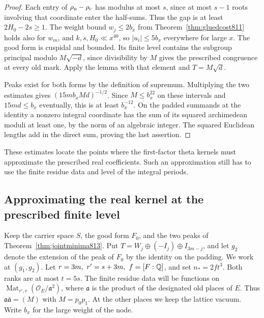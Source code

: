 \documentclass[a4paper,11pt]{article}
\theoremstyle{definition}
\theoremstyle{remark}
\numberwithin{equation}{section}
\begin{document}
\begin{proof}
Each entry of \(\rho_{\rm n}-\rho_{\rm c}\) has modulus
at most \(s\), since at most \(s-1\) roots involving that
coordinate enter the half-sums. Thus the gap is at least
\(2H_0-2s\ge1\). The weight bound \(w_j\le2b_x\) from
Theorem~\ref{thm:gluedcost811} holds also for \(w_m\),
and \(k,s,H_0\ll x^{40}\), so \(|u_i|\le5b_x\) everywhere
for large \(x\). The good form is cuspidal and bounded.
Its finite level contains the subgroup principal modulo
\(M\sqrt{-d}\), since divisibility by \(M\) gives the
prescribed congruence at every old mark. Apply the lemma
with that element and \(T=M\sqrt d\).

Peaks exist for both forms by the definition of supremum.
Multiplying the two estimates gives
\((15m b_x M d)^{-1/2}\). Since \(M\le b_x^{22}\) on
these intervals and \(15md\le b_x\) eventually, this is
at least \(b_x^{-12}\). On the padded summands at the
identity a nonzero integral coordinate has the sum of
its squared archimedean moduli at least one, by the norm
of an algebraic integer. The squared Euclidean lengths add
in the direct sum, proving the last assertion.
\end{proof}

These estimates locate the points where the first-factor
theta kernels must approximate the prescribed real
coefficients. Such an approximation still has to use the
finite residue data and level of the integral periods.
\clearpage

\subsection{Approximating the real kernel at the prescribed finite level}
\label{sec:sparseperiod814}
Keep the carrier space \(S\), the good form \(F_0\), and the
two peaks of Theorem~\ref{thm:jointminima813}. Put
\(T=W_j\oplus(-I_j)\oplus I_{3m-j}\), and let \(g_2\)
denote the extension of the peak of \(F_0\) by the identity
on the padding. We work at \((g_1,g_2)\).
Let \(r=3m,\ r'=s+3m,\ f=[F:\mathbb Q]\), and set
\(n_*=2ft^3\). Both ranks are at most \(t=5s\).
The finite residue data will be functions on
\(\operatorname{Mat}_{r',r}(\mathcal O_E/\mathfrak a^2)\),
where \(\mathfrak a\) is the product of the designated old
places of \(E\). Thus \(\mathfrak a\bar{\mathfrak a}=(M)\)
with \(M=p_0p_1\). At the other places we keep the lattice
vacuum. Write \(b_x\) for the large weight of the node.
\end{document}
